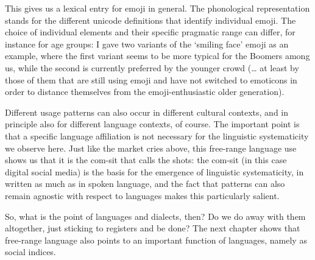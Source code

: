 This gives us a lexical entry for emoji in general. The phonological representation stands for the different unicode definitions that identify individual emoji. The choice of individual elements and their specific pragmatic range can differ, for instance for age groups: I gave two variants of the ‘smiling face’ emoji as an example, where the first variant seems to be more typical for the Boomers among us, while the second is currently preferred by the younger crowd (… at least by those of them that are still using emoji and have not switched to emoticons in order to distance themselves from the emoji-enthusiastic older generation).

Different usage patterns can also occur in different cultural contexts, and in principle also for different language contexts, of course. The important point is that a specific language affiliation is not necessary for the linguistic systematicity we observe here. Just like the market cries above, this free-range language use shows us that it is the com-sit that calls the shots: the com-sit (in this case digital social media) is the basis for the emergence of linguistic systematicity, in written as much as in spoken language, and the fact that patterns can also remain agnostic with respect to languages makes this particularly salient.

So, what is the point of languages and dialects, then? Do we do away with them altogether, just sticking to registers and be done? The next chapter shows that free-range language also points to an important function of languages, namely as social indices.
